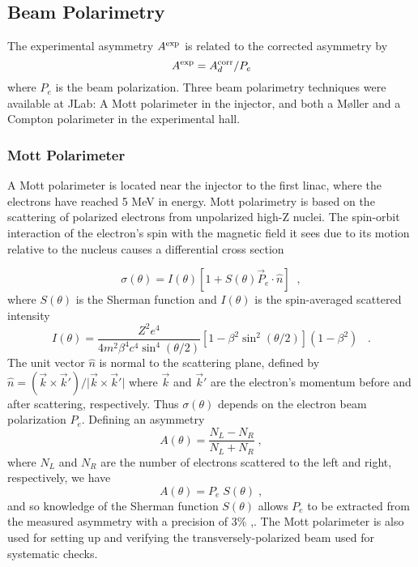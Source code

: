 \subsection{Beam Polarimetry}
\label{sec:beam_pol}
The experimental asymmetry $A^{\rm exp}$ is related 
to the corrected asymmetry by 
\begin{equation}
A^{\rm exp}=A^{\rm corr}_d/P_e
\label{eq:a_exp}
\end{equation}
where $P_e$ is the beam polarization. 
Three beam polarimetry techniques were available at JLab: 
A Mott polarimeter in the injector, and both a M{\o}ller
and a Compton polarimeter in the experimental hall.

\subsubsection{Mott Polarimeter}
\label{sec:mpt_exp_meth}
A Mott polarimeter \cite{Price}
is located near the injector to the first linac, where the
electrons have reached 5 MeV in energy. Mott polarimetry is based on the 
scattering of polarized electrons from unpolarized high-Z nuclei. The
spin-orbit interaction of the electron's spin with the magnetic field it sees due to its
motion relative to the nucleus causes a differential cross section

\begin{equation}\label{mottcrosssection}
\sigma(\theta) = I(\theta)
\left[1 + S(\theta){\vec P_e}\cdot \widehat{n}\right]\;\;,
\end{equation}
where $S(\theta)$ is the Sherman function
and 
$I(\theta)$ is the spin-averaged scattered intensity
\begin{equation}
I(\theta)= \frac{Z^2 e^4}{4m^2\beta^4 c^4 \sin^4(\theta/2)} \left[1 - \beta^2\sin^2(\theta/2)\right](1 - \beta^2) \;\;\; .
\end{equation}
 The unit vector ${\widehat n}$ is normal to the scattering plane, defined by
$
\widehat n = (\vec k \times \vec k')/\vert \vec k \times \vec k' \vert
$
where $\vec k$ and $\vec k'$ are the electron's momentum before and
after scattering, respectively. Thus $\sigma(\theta)$ depends on the electron beam polarization $P_e$.
Defining an asymmetry
\begin{equation}
A(\theta) = \frac{N_L - N_R}{N_L + N_R} \; ,
\end{equation}
where $N_L$ and $N_R$ are the number of electrons scattered to the left and
right, respectively, we have 
\begin{equation}
A(\theta) = P_e \; S(\theta) \;,
\end{equation}
and so knowledge of the Sherman function $S(\theta)$
allows $P_e$ to be extracted from the measured asymmetry
with a precision of 3\% \cite{Sinclair1},\cite{happex_long}.
The Mott polarimeter is also used for setting up and verifying
the transversely-polarized beam used for systematic checks.

